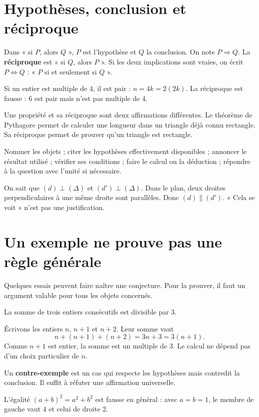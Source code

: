 \documentclass[../cours_3e.tex]{subfiles}
\begin{document}
\section{Hypothèses, conclusion et réciproque}
\begin{definition}
Dans « si $P$, alors $Q$ », $P$ est l'hypothèse et $Q$ la conclusion. On note $P\Rightarrow Q$. La \textbf{réciproque} est « si $Q$, alors $P$ ». Si les deux implications sont vraies, on écrit $P\Leftrightarrow Q$ : « $P$ si et seulement si $Q$ ».
\end{definition}
Si un entier est multiple de $4$, il est pair : $n=4k=2(2k)$. La réciproque est fausse : $6$ est pair mais n'est pas multiple de $4$.
\begin{attention}
Une propriété et sa réciproque sont deux affirmations différentes. Le théorème de Pythagore permet de calculer une longueur dans un triangle déjà connu rectangle. Sa réciproque permet de prouver qu'un triangle est rectangle.
\end{attention}
\begin{methode}
Nommer les objets ; citer les hypothèses effectivement disponibles ; annoncer le résultat utilisé ; vérifier ses conditions ; faire le calcul ou la déduction ; répondre à la question avec l'unité si nécessaire.
\end{methode}
\begin{exemple}
On sait que $(d)\perp(\Delta)$ et $(d')\perp(\Delta)$. Dans le plan, deux droites perpendiculaires à une même droite sont parallèles. Donc $(d)\parallel(d')$. « Cela se voit » n'est pas une justification.
\end{exemple}

\section{Un exemple ne prouve pas une règle générale}
Quelques essais peuvent faire naître une conjecture. Pour la prouver, il faut un argument valable pour tous les objets concernés.
\begin{theoreme}
La somme de trois entiers consécutifs est divisible par $3$.
\end{theoreme}
\begin{demonstration}
Écrivons les entiers $n$, $n+1$ et $n+2$. Leur somme vaut
\[n+(n+1)+(n+2)=3n+3=3(n+1).\]
Comme $n+1$ est entier, la somme est un multiple de $3$. Le calcul ne dépend pas d'un choix particulier de $n$.
\end{demonstration}
\begin{definition}
Un \textbf{contre-exemple} est un cas qui respecte les hypothèses mais contredit la conclusion. Il suffit à réfuter une affirmation universelle.
\end{definition}
L'égalité $(a+b)^2=a^2+b^2$ est fausse en général : avec $a=b=1$, le membre de gauche vaut $4$ et celui de droite $2$.
\end{document}
